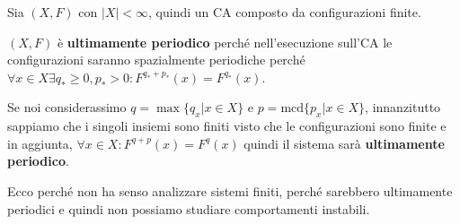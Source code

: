 \begin{nota}
    Sia $(X,F)$ con $|X|<\infty$, quindi un CA composto da configurazioni finite.

    $(X,F)$ è \textbf{ultimamente periodico} perché nell'esecuzione sull'CA le
    configurazioni saranno spazialmente periodiche perché
    $\forall x\in X\exists q_\ast \ge 0, p_\ast >0: F^{q_\ast +p_\ast}(x)=F^{q_\ast}(x)$.

    Se noi considerassimo $q=\max\{q_x|x\in X\}$ e $p=\text{mcd}\{p_x|x\in X\}$,
    innanzitutto sappiamo che i singoli insiemi sono finiti visto che le configurazioni
    sono finite e in aggiunta, $\forall x\in X:F^{q+p}(x)=F^{q}(x)$
    quindi il sistema sarà \textbf{ultimamente periodico}.
\end{nota}

Ecco perché non ha senso analizzare sistemi finiti, perché sarebbero ultimamente
periodici e quindi non possiamo studiare comportamenti instabili.


